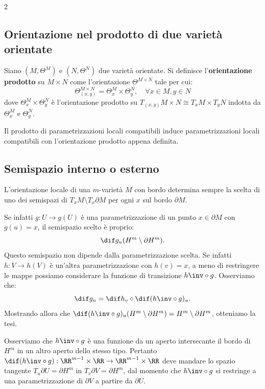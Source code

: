 \begin{multicols*}{2}
    \subsection{Orientazione nel prodotto di due varietà orientate}

    \begin{definition}
        Siano $(M, \Theta^M)$ e $(N, \Theta^N)$ due varietà orientate.
        Si definisce l'\textbf{orientazione prodotto} su $M \times N$
        come l'orientazione $\Theta^{M \times N}$ tale per cui:
        \[
            \boxed{\Theta_{(x, y)}^{M \times N} = \Theta_x^M \times \Theta_y^N, \quad \forall x \in M, y \in N}
        \]
        dove $\Theta_x^M \times \Theta_y^N$ è l'orientazione prodotto su
        $T_{(x, y)} M \times N \cong T_x M \times T_y N$ indotta da
        $\Theta_x^M$ e $\Theta_y^N$. \smallskip

        Il prodotto di parametrizzazioni locali compatibili induce parametrizzazioni
        locali compatibili con l'orientazione prodotto appena definita.
    \end{definition}

    \subsection{Semispazio interno o esterno}

    \begin{remark}
        L'orientazione locale di una $m$-varietà $M$ con bordo determina sempre la scelta di uno dei semispazi di
        $T_x M \setminus T_x \partial M$ per ogni $x$ sul bordo $\partial M$. \smallskip

        Se infatti $g : U \to g(U)$ è una parametrizzazione di un punto $x \in \partial M$ con $g(u) = x$,
        il semispazio scelto è proprio:
        \[ \dif g_u (H^m \setminus \partial H^m). \]
        Questo semispazio non dipende dalla parametrizzazione scelta. Se infatti $h : V \to h(V)$ è
        un'altra parametrizzazione con $h(v) = x$, a meno di restringere le mappe possiamo considerare
        la funzione di transizione $h\inv \circ g$. Osserviamo che:
        \[
            \dif g_u = \dif h_v \circ \dif (h\inv \circ g)_u.
        \]
        Mostrando allora che $\dif (h\inv \circ g)_u(H^m \setminus \partial H^m) = H^m \setminus \partial H^m$,
        otteniamo la tesi. \smallskip

        Osserviamo che $h\inv \circ g$ è una funzione da un aperto intersecante il bordo di $H^m$ in
        un altro aperto dello stesso tipo. Pertanto $\dif (h\inv \circ g) : \RR^{m-1} \times \RR \to \RR^{m-1} \times \RR$
        deve mandare lo spazio tangente $T_u \partial U = \partial H^m$ in $T_v \partial V = \partial H^m$, dal momento che $h\inv \circ g$
        si restringe a una parametrizzazione di $\partial V$ a partire da $\partial U$. \smallskip


\end{remark}
\end{multicols*}
